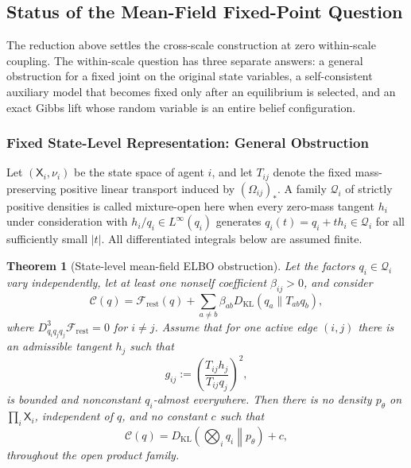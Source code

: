 \documentclass[11pt]{article}
\newtheorem{theorem}{Theorem}
\begin{document}
\subsection{Status of the Mean-Field Fixed-Point Question}
\label{app:mf_fixedpoint_status}

The reduction above settles the cross-scale construction at zero within-scale coupling. The within-scale question has three separate answers: a general obstruction for a fixed joint on the original state variables, a self-consistent auxiliary model that becomes fixed only after an equilibrium is selected, and an exact Gibbs lift whose random variable is an entire belief configuration.

\subsubsection{Fixed State-Level Representation: General Obstruction}

Let $(\mathsf{X}_i,\nu_i)$ be the state space of agent $i$, and let $T_{ij}$ denote the fixed mass-preserving positive linear transport induced by $(\Omega_{ij})_*$. A family $\mathcal{Q}_i$ of strictly positive densities is called mixture-open here when every zero-mass tangent $h_i$ under consideration with $h_i/q_i\in L^\infty(q_i)$ generates $q_i(t)=q_i+t h_i\in\mathcal{Q}_i$ for all sufficiently small $|t|$. All differentiated integrals below are assumed finite.

\begin{theorem}[State-level mean-field ELBO obstruction]
\label{thm:state_level_elbo_nogo}
Let the factors $q_i\in\mathcal{Q}_i$ vary independently, let at least one nonself coefficient $\beta_{ij}>0$, and consider
\begin{equation}
\mathcal{C}(q)
=\mathcal{F}_{\mathrm{rest}}(q)
+\sum_{a\ne b}\beta_{ab}D_{\mathrm{KL}}(q_a\|T_{ab}q_b),
\label{eq:population_consensus_nogo_functional}
\end{equation}
where $D^3_{q_iq_jq_j}\mathcal{F}_{\mathrm{rest}}=0$ for $i\ne j$. Assume that for one active edge $(i,j)$ there is an admissible tangent $h_j$ such that
\begin{equation}
g_{ij}:=\left(\frac{T_{ij}h_j}{T_{ij}q_j}\right)^2,
\label{eq:nogo_nondegenerate_tangent}
\end{equation}
is bounded and nonconstant $q_i$-almost everywhere. Then there is no density $p_\theta$ on $\prod_i\mathsf{X}_i$, independent of $q$, and no constant $c$ such that
\begin{equation}
\mathcal{C}(q)
=D_{\mathrm{KL}}\left(\bigotimes_iq_i\middle\|p_\theta\right)+c,
\label{eq:state_level_elbo_representation_impossible}
\end{equation}
throughout the open product family.
\end{theorem}
\end{document}
